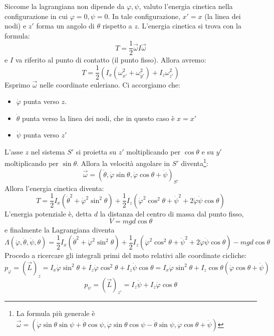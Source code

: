 \documentclass[a4paper,openany]{article}
\begin{document}
	Siccome la lagrangiana non dipende da $\varphi,\psi$, valuto l'energia cinetica nella configurazione in cui $\varphi=0, \psi=0$. In tale configurazione, $x' = x $ (la linea dei nodi) e $z'$ forma un angolo di $\theta$ rispetto a $z$. L'energia cinetica si trova con la formula:
	$$
	T =\dfrac{1}{2} \vec{\omega}I\vec{\omega}
	$$
	e $I$ va riferito al punto di contatto (il punto fisso). Allora avremo:
	$$
	T = \dfrac{1}{2}(I_x(\omega_{x'}^2+\omega^{2}_{y'})+I_z\omega^{2}_{z'})
	$$
	Esprimo $\vec{\omega}$ nelle coordinate euleriano. Ci accorgiamo che:
	\begin{itemize}
		\item $\dot{\varphi}$ punta verso $z$.
		\item $\dot{\theta}$ punta verso la linea dei nodi, che in questo caso è $x = x'$
		\item $\dot{\psi}$ punta verso $z'$
	\end{itemize}
	L'asse $z$ nel sistema $S'$ si proietta su $z'$ moltiplicando per $\cos\theta$ e su $y'$ moltiplicando per $\sin\theta$. Allora la velocità angolare in $S'$ diventa\footnote{La formula più generale è $\vec{\omega} = (\dot{\varphi}\sin\theta\sin\psi + \dot\theta\cos\psi, \dot{\varphi}\sin\theta\cos\psi - \dot{\theta}\sin\psi, \dot{\varphi}\cos\theta + \dot{\psi})$}:
	$$
	\vec{\omega} = (\dot{\theta},\dot{\varphi}\sin\theta, \dot{\varphi}\cos\theta + \dot{\psi})_{S'}
	$$
	Allora l'energia cinetica diventa:
	\begin{equation}\label{key}
		T = \dfrac{1}{2}I_x (\dot{\theta}^{2}+ \dot{\varphi}^2\sin^{2}\theta)+\dfrac{1}{2}I_z(\dot{\varphi}^{2}\cos^{2}\theta+\dot{\psi}^{2}+2\dot{\varphi}\dot{\psi}\cos\theta)
	\end{equation}
	L'energia potenziale è, detta $d$ la distanza del centro di massa dal punto fisso,
	$$
	V = mgd\cos\theta
	$$
	e finalmente la Lagrangiana diventa
	\begin{equation}\label{key}
		\Lambda(\dot{\varphi},\dot{\theta},\dot{\psi},\theta) = \dfrac{1}{2}I_x (\dot{\theta}^{2}+ \dot{\varphi}^2\sin^{2}\theta)+\dfrac{1}{2}I_z(\dot{\varphi}^{2}\cos^{2}\theta+\dot{\psi}^{2}+2\dot{\varphi}\dot{\psi}\cos\theta) - mgd\cos\theta
	\end{equation}
	Procedo a ricercare gli integrali primi del moto relativi alle coordinate cicliche:
	$$
	p_{\varphi} = (\vec{L})_{z} = I_x\dot{\varphi}\sin^2\theta + I_z\dot{\varphi}\cos^{2}\theta + I_z \dot{\psi}\cos\theta = I_x \dot{\varphi}\sin^2\theta + I_z \cos\theta(\dot{\varphi}\cos\theta+\dot{\psi})
	$$
	$$
	p_{\psi} = (\vec{L})_{z'} =  I_z\dot{\psi} + I_z \dot{\varphi}\cos\theta
	$$
\end{document}
